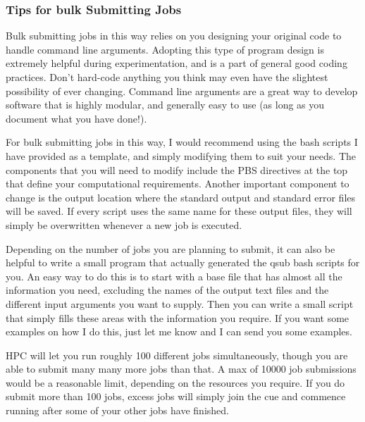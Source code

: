 \subsubsection{Tips for bulk Submitting Jobs}
Bulk submitting jobs in this way relies on you designing your original code to handle command line arguments. Adopting this type of program design is extremely helpful during experimentation, and is a part of general good coding practices. Don't hard-code anything you think may even have the slightest possibility of ever changing. Command line arguments are a great way to develop software that is highly modular, and generally easy to use (as long as you document what you have done!).
%
%
\par
%
%
For bulk submitting jobs in this way, I would recommend using the bash scripts I have provided as a template, and simply modifying them to suit your needs. The components that you will need to modify include the PBS directives at the top that define your computational requirements. Another important component to change is the output location where the standard output and standard error files will be saved. If every script uses the same name for these output files, they will simply be overwritten whenever a new job is executed.
%
%
\par
Depending on the number of jobs you are planning to submit, it can also be helpful to write a small program that actually generated the qsub bash scripts for you. An easy way to do this is to start with a base file that has almost all the information you need, excluding the names of the output text files and the different input arguments you want to supply. Then you can write a small script that simply fills these areas with the information you require. If you want some examples on how I do this, just let me know and I can send you some examples.
%
%
\par
HPC will let you run roughly 100 different jobs simultaneously, though you are able to submit many many more jobs than that. A max of 10000 job submissions would be a reasonable limit, depending on the resources you require. If you do submit more than 100 jobs, excess jobs will simply join the cue and commence running after some of your other jobs have finished.
%
%
%
